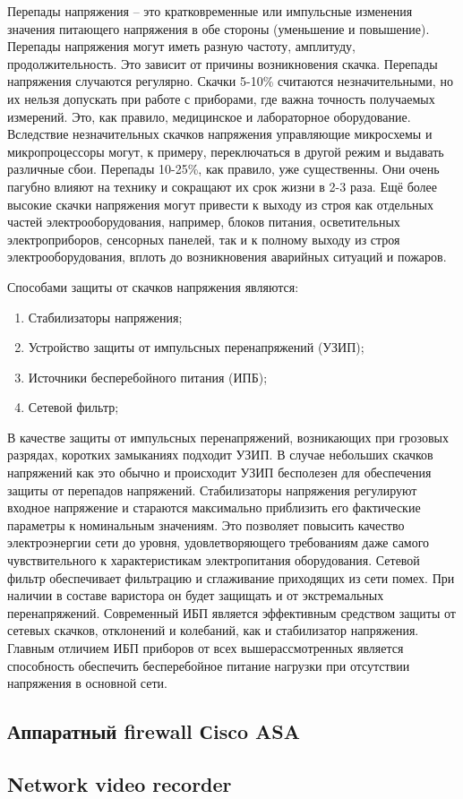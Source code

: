 Перепады напряжения – это кратковременные
или импульсные изменения значения питающего напряжения в обе стороны (уменьшение и
повышение). Перепады напряжения могут иметь разную частоту, амплитуду,
продолжительность. Это зависит от причины возникновения скачка. Перепады напряжения
случаются регулярно. Скачки 5-10\% считаются незначительными, но их нельзя допускать
при работе с приборами, где важна точность получаемых измерений. Это, как правило,
медицинское и лабораторное оборудование. Вследствие незначительных скачков
напряжения управляющие микросхемы и микропроцессоры могут, к примеру,
переключаться в другой режим и выдавать различные сбои. Перепады 10-25\%, как правило,
уже существенны. Они очень пагубно влияют на технику и сокращают их срок жизни в 2-3
раза. Ещё более высокие скачки напряжения могут привести к выходу из строя как
отдельных частей электрооборудования, например, блоков питания, осветительных
электроприборов, сенсорных панелей, так и к полному выходу из строя
электрооборудования, вплоть до возникновения аварийных ситуаций и пожаров. 

Способами защиты от скачков напряжения являются:
\begin{enumerate}
    \item Стабилизаторы напряжения;
    \item Устройство защиты от импульсных перенапряжений (УЗИП);
    \item Источники бесперебойного питания (ИПБ);
    \item Сетевой фильтр;
\end{enumerate}

В качестве защиты от импульсных перенапряжений, возникающих при грозовых разрядах, коротких замыканиях подходит УЗИП. В случае небольших скачков
напряжений как это обычно и происходит УЗИП бесполезен для обеспечения защиты от перепадов напряжений. Стабилизаторы напряжения
регулируют входное напряжение и стараются максимально приблизить его фактические параметры к номинальным значениям. Это позволяет
повысить качество электроэнергии сети до уровня, удовлетворяющего требованиям даже самого чувствительного к характеристикам электропитания оборудования.
Сетевой фильтр обеспечивает фильтрацию и сглаживание приходящих из сети помех. При наличии в составе варистора он будет защищать и от экстремальных перенапряжений. 
Современный ИБП является эффективным средством защиты от сетевых скачков, отклонений и колебаний, как и стабилизатор напряжения.
Главным отличием ИБП приборов от всех вышерассмотренных является способность обеспечить бесперебойное питание нагрузки при отсутствии напряжения в основной сети. 

\subsection{Аппаратный firewall Сisco ASA}



\subsection{Network video recorder}